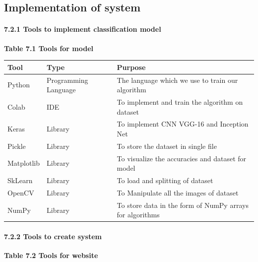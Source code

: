 \documentclass{article} %
\begin{document}
\subsection{ Implementation of system}

\noindent 
\paragraph{7.2.1 Tools to implement classification model}

\noindent \textbf{Table 7.1 Tools for model}

\begin{tabular}{|p{0.6in}|p{0.8in}|p{2.7in}|} \hline 
\textbf{Tool} & \textbf{Type} & \textbf{Purpose} \\ \hline 
Python & Programming Language & The language which we use to train our algorithm \\ \hline 
Colab & IDE & To implement and train the algorithm on dataset \\ \hline 
Keras & Library & To implement CNN VGG-16 and Inception Net \\ \hline 
Pickle & Library & To store the dataset in single file \\ \hline 
Matplotlib & Library & To visualize the accuracies and dataset for model \\ \hline 
SkLearn & Library & To load and splitting of dataset \\ \hline 
OpenCV & Library & To Manipulate all the images of dataset \\ \hline 
NumPy & Library & To store data in the form of NumPy arrays for algorithms \\ \hline 
\end{tabular}

\textbf{}

\noindent 
\paragraph{7.2.2 Tools to create system}

\noindent \textbf{Table 7.2 Tools for website}
\end{document}
